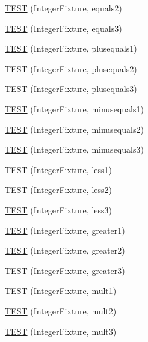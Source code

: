 \begin{DoxyCompactItemize}
\hyperlink{_old_test_integer_8c_09_09_ae58932a92711f57ac65494c4ead377d2}{T\-E\-S\-T} (Integer\-Fixture, equals2)
\item 
\hyperlink{_old_test_integer_8c_09_09_a42ba62d3f14fe4b5cff95a34e8f13b6d}{T\-E\-S\-T} (Integer\-Fixture, equals3)
\item 
\hyperlink{_old_test_integer_8c_09_09_acf172005d59d90ec2a717dc5c24ad116}{T\-E\-S\-T} (Integer\-Fixture, plusequals1)
\item 
\hyperlink{_old_test_integer_8c_09_09_af4b1d9aec3f53685874e394058933ddf}{T\-E\-S\-T} (Integer\-Fixture, plusequals2)
\item 
\hyperlink{_old_test_integer_8c_09_09_ab38cb518840e042d883dbd9f99294cfd}{T\-E\-S\-T} (Integer\-Fixture, plusequals3)
\item 
\hyperlink{_old_test_integer_8c_09_09_aad7c7f1df8a17754b672fb0814028594}{T\-E\-S\-T} (Integer\-Fixture, minusequals1)
\item 
\hyperlink{_old_test_integer_8c_09_09_ad3f011001948053ea04e26bd5785eafb}{T\-E\-S\-T} (Integer\-Fixture, minusequals2)
\item 
\hyperlink{_old_test_integer_8c_09_09_a50852386400cfffa90dcea55467ee8b2}{T\-E\-S\-T} (Integer\-Fixture, minusequals3)
\item 
\hyperlink{_old_test_integer_8c_09_09_a7eab988ae79730f25939e28590af6fe9}{T\-E\-S\-T} (Integer\-Fixture, less1)
\item 
\hyperlink{_old_test_integer_8c_09_09_a7b6b4b595f6c5f3e5f7716dc68b85860}{T\-E\-S\-T} (Integer\-Fixture, less2)
\item 
\hyperlink{_old_test_integer_8c_09_09_a44c4b5f6952d68d45f29fd40b16aa826}{T\-E\-S\-T} (Integer\-Fixture, less3)
\item 
\hyperlink{_old_test_integer_8c_09_09_aba5303513d3c169fc11d047aae16656b}{T\-E\-S\-T} (Integer\-Fixture, greater1)
\item 
\hyperlink{_old_test_integer_8c_09_09_a897c0eb0c03a330f83d9ec2a6fdcd947}{T\-E\-S\-T} (Integer\-Fixture, greater2)
\item 
\hyperlink{_old_test_integer_8c_09_09_a63f2ed7e8e3587850fd28be378d8a93e}{T\-E\-S\-T} (Integer\-Fixture, greater3)
\item 
\hyperlink{_old_test_integer_8c_09_09_a5d30a6ab911b01849840d6d47c2ade65}{T\-E\-S\-T} (Integer\-Fixture, mult1)
\item 
\hyperlink{_old_test_integer_8c_09_09_a6c3d51862b488434aa06e22be78e4ab6}{T\-E\-S\-T} (Integer\-Fixture, mult2)
\item 
\hyperlink{_old_test_integer_8c_09_09_af7570044c2a5bf577285576ffa999335}{T\-E\-S\-T} (Integer\-Fixture, mult3)

\end{DoxyCompactItemize}
